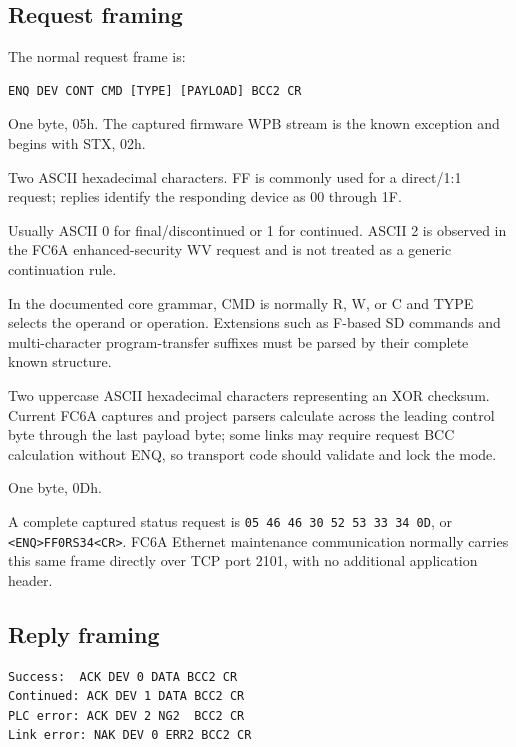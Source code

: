 \documentclass[10pt,letterpaper]{article}
\begin{document}
\subsection{Request framing}
The normal request frame is:
\begin{Verbatim}[breaklines=true,breakanywhere=true]
ENQ DEV CONT CMD [TYPE] [PAYLOAD] BCC2 CR
\end{Verbatim}

\begin{description}[style=nextline,leftmargin=3.2cm,labelwidth=3.0cm,font=\normalfont\bfseries]
\item[ENQ] One byte, 05h. The captured firmware WPB stream is the known exception and begins with STX, 02h.
\item[DEV] Two ASCII hexadecimal characters. FF is commonly used for a direct/1:1 request; replies identify the responding device as 00 through 1F.
\item[CONT] Usually ASCII 0 for final/discontinued or 1 for continued. ASCII 2 is observed in the FC6A enhanced-security WV request and is not treated as a generic continuation rule.
\item[CMD / TYPE] In the documented core grammar, CMD is normally R, W, or C and TYPE selects the operand or operation. Extensions such as F-based SD commands and multi-character program-transfer suffixes must be parsed by their complete known structure.
\item[BCC2] Two uppercase ASCII hexadecimal characters representing an XOR checksum. Current FC6A captures and project parsers calculate across the leading control byte through the last payload byte; some links may require request BCC calculation without ENQ, so transport code should validate and lock the mode.
\item[CR] One byte, 0Dh.
\end{description}

A complete captured status request is \texttt{05 46 46 30 52 53 33 34 0D}, or \texttt{<ENQ>FF0RS34<CR>}. FC6A Ethernet maintenance communication normally carries this same frame directly over TCP port 2101, with no additional application header.

\subsection{Reply framing}
\begin{Verbatim}[breaklines=true,breakanywhere=true]
Success:  ACK DEV 0 DATA BCC2 CR
Continued: ACK DEV 1 DATA BCC2 CR
PLC error: ACK DEV 2 NG2  BCC2 CR
Link error: NAK DEV 0 ERR2 BCC2 CR
\end{Verbatim}
\end{document}
